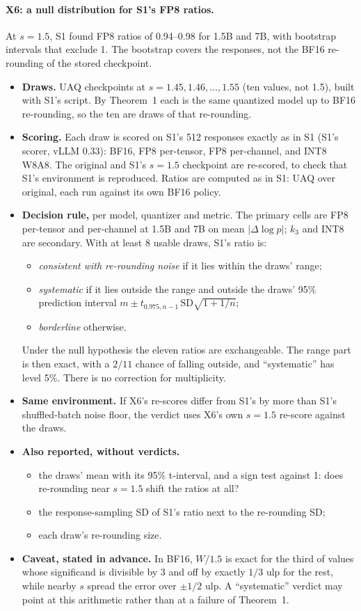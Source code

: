 \documentclass[11pt]{article}
\begin{document}
\paragraph{X6: a null distribution for S1's FP8 ratios.}
At $s=1.5$, S1 found FP8 ratios of 0.94--0.98 for 1.5B and 7B, with bootstrap intervals that exclude 1. The bootstrap covers the responses, not the BF16 re-rounding of the stored checkpoint.
\begin{itemize}
\item \textbf{Draws.} UAQ checkpoints at $s=1.45, 1.46,\dots,1.55$ (ten values, not 1.5), built with S1's script. By Theorem~1 each is the same quantized model up to BF16 re-rounding, so the ten are draws of that re-rounding.
\item \textbf{Scoring.} Each draw is scored on S1's 512 responses exactly as in S1 (S1's scorer, vLLM 0.33): BF16, FP8 per-tensor, FP8 per-channel, and INT8 W8A8. The original and S1's $s=1.5$ checkpoint are re-scored, to check that S1's environment is reproduced. Ratios are computed as in S1: UAQ over original, each run against its own BF16 policy.
\item \textbf{Decision rule,} per model, quantizer and metric. The primary cells are FP8 per-tensor and per-channel at 1.5B and 7B on mean $|\Delta\log p|$; $k_3$ and INT8 are secondary. With at least 8 usable draws, S1's ratio is:
  \begin{itemize}
  \item \emph{consistent with re-rounding noise} if it lies within the draws' range;
  \item \emph{systematic} if it lies outside the range and outside the draws' 95\% prediction interval $m\pm t_{0.975,n-1}\,\mathrm{SD}\sqrt{1+1/n}$;
  \item \emph{borderline} otherwise.
  \end{itemize}
  Under the null hypothesis the eleven ratios are exchangeable. The range part is then exact, with a $2/11$ chance of falling outside, and ``systematic'' has level 5\%. There is no correction for multiplicity.
\item \textbf{Same environment.} If X6's re-scores differ from S1's by more than S1's shuffled-batch noise floor, the verdict uses X6's own $s=1.5$ re-score against the draws.
\item \textbf{Also reported, without verdicts.}
  \begin{itemize}
  \item the draws' mean with its 95\% t-interval, and a sign test against 1: does re-rounding near $s=1.5$ shift the ratios at all?
  \item the response-sampling SD of S1's ratio next to the re-rounding SD;
  \item each draw's re-rounding size.
  \end{itemize}
\item \textbf{Caveat, stated in advance.} In BF16, $W/1.5$ is exact for the third of values whose significand is divisible by 3 and off by exactly $1/3$ ulp for the rest, while nearby $s$ spread the error over $\pm1/2$ ulp. A ``systematic'' verdict may point at this arithmetic rather than at a failure of Theorem~1.
\end{itemize}
\end{document}
